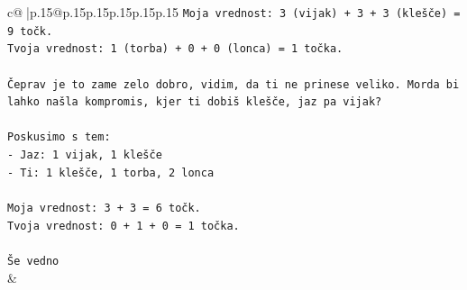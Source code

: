 \documentclass{article}
\begin{document}
{\begin{supertabular}{c@{$\;$}|p{.15\linewidth}@{}p{.15\linewidth}p{.15\linewidth}p{.15\linewidth}p{.15\linewidth}p{.15\linewidth}}
{{{\texttt{Moja vrednost: 3 (vijak) + 3 + 3 (klešče) = 9 točk.} \\
\texttt{Tvoja vrednost: 1 (torba) + 0 + 0 (lonca) = 1 točka.} \\
\\ 
\texttt{Čeprav je to zame zelo dobro, vidim, da ti ne prinese veliko. Morda bi lahko našla kompromis, kjer ti dobiš klešče, jaz pa vijak?} \\
\\ 
\texttt{Poskusimo s tem:} \\
\texttt{{-} Jaz: 1 vijak, 1 klešče} \\
\texttt{{-} Ti: 1 klešče, 1 torba, 2 lonca} \\
\\ 
\texttt{Moja vrednost: 3 + 3 = 6 točk.} \\
\texttt{Tvoja vrednost: 0 + 1 + 0 = 1 točka.} \\
\\ 
\texttt{Še vedno} \\
            }
        }
    }
    & \\ \\


\end{supertabular}}
\end{document}
